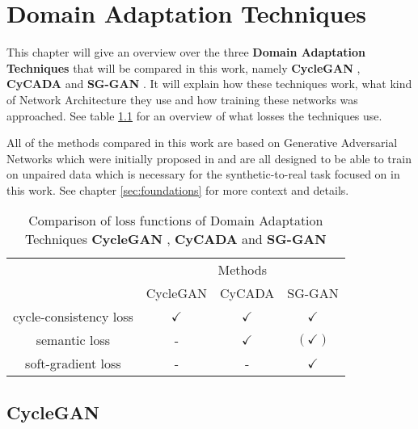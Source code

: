 \chapter{Domain Adaptation Techniques}
\label{sec:techniques}

This chapter will give an overview over the three \textbf{Domain Adaptation Techniques} that will be compared in this work, namely \textbf{CycleGAN} \cite{DBLP:journals/corr/ZhuPIE17}, \textbf{CyCADA} \cite{DBLP:journals/corr/abs-1711-03213} and \textbf{SG-GAN} \cite{DBLP:journals/corr/abs-1801-01726}. It will explain how these techniques work, what kind of Network Architecture they use and how training these networks was approached. See table \ref{table:DA_comparison} for an overview of what losses the techniques use.

All of the methods compared in this work are based on Generative Adversarial Networks which were initially proposed in \cite{NIPS2014_5423} and are all designed to be able to train on unpaired data which is necessary for the synthetic-to-real task focused on in this work. See chapter \ref{sec:foundations} for more context and details.

\begin{table}
	\centering
	\begin{tabular}{|c|c|c|c|}
		\multicolumn{1}{c}{} & \multicolumn{3}{c}{Methods}\\
		\cline{2-4}
		\multicolumn{1}{c|}{} & CycleGAN & CyCADA & SG-GAN\\
		\hline
		cycle-consistency loss & $\checkmark$ & $\checkmark$ & $\checkmark$\\
		\hline
		semantic loss & - & $\checkmark$ & $(\checkmark)$\\
		\hline 
		soft-gradient loss & - & - & $\checkmark$\\
		\hline
	\end{tabular} 
	\caption{Comparison of loss functions of Domain Adaptation Techniques \textbf{CycleGAN} \cite{DBLP:journals/corr/ZhuPIE17}, \textbf{CyCADA} \cite{DBLP:journals/corr/abs-1711-03213} and \textbf{SG-GAN} \cite{DBLP:journals/corr/abs-1801-01726}}
	\label{table:DA_comparison}
\end{table}

\section{CycleGAN} 

